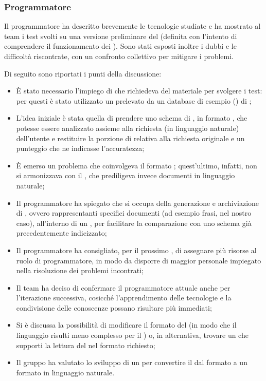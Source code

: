 \subsubsection{Programmatore}
\par Il programmatore ha descritto brevemente le tecnologie studiate e ha mostrato al team i test svolti su una versione preliminare del  (definita con l'intento di comprendere il funzionamento dei ). Sono stati esposti inoltre i dubbi e le difficoltà riscontrate, con un confronto collettivo per mitigare i problemi.
\par Di seguito sono riportati i punti della discussione:
\begin{itemize}
	\item È stato necessario l'impiego di  che richiedeva del materiale per svolgere i test: per questi è stato utilizzato un  prelevato da un database di esempio () di ;
	\item L'idea iniziale è stata quella di prendere uno schema di , in formato , che potesse essere analizzato assieme alla richiesta (in linguaggio naturale) dell'utente e restituire la porzione di  relativa alla richiesta originale e un punteggio che ne indicasse l'accuratezza;
	\item È emerso un problema che coinvolgeva il formato ; quest'ultimo, infatti, non si armonizzava con il , che prediligeva invece documenti in linguaggio naturale;
	\item Il programmatore ha spiegato che  si occupa della generazione e archiviazione di , ovvero  rappresentanti specifici documenti (ad esempio frasi, nel nostro caso), all'interno di un , per facilitare la comparazione con uno schema già precedentemente indicizzato;
	\item Il programmatore ha consigliato, per il prossimo , di assegnare più risorse al ruolo di programmatore, in modo da disporre di maggior personale impiegato nella risoluzione dei problemi incontrati;
	\item Il team ha deciso di confermare il programmatore attuale anche per l’iterazione successiva, cosicché l'apprendimento delle tecnologie e la condivisione delle conoscenze possano risultare più immediati;
	\item Si è discussa la possibilità di modificare il formato del  (in modo che il linguaggio risulti meno complesso per il ) o, in alternativa, trovare un  che supporti la lettura del  nel formato richiesto;
	\item Il gruppo ha valutato lo sviluppo di un  per convertire il  dal formato  a un formato in linguaggio naturale.
\end{itemize}

